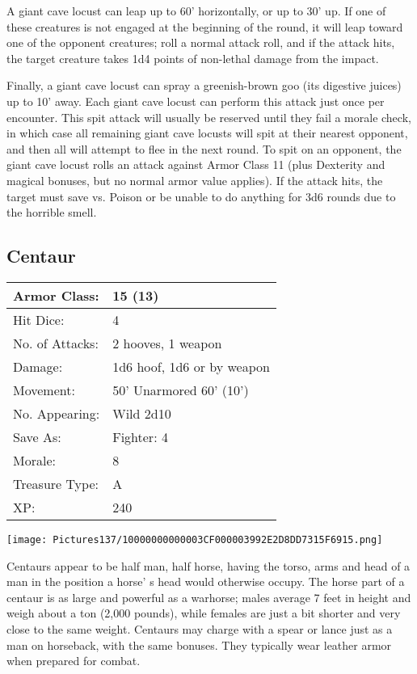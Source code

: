 \documentclass[a4paper,twoside,openany,10pt]{book}
\begin{document}
\begin{multicols}{2}
A giant cave locust can leap up to 60' horizontally, or up to 30' up. If one of these creatures is not engaged at the beginning of the round, it will leap toward one of the opponent creatures; roll a normal attack roll, and if the attack hits, the target creature takes 1d4 points of non-lethal damage from the impact.

Finally, a giant cave locust can spray a greenish-brown goo (its digestive juices) up to 10' away. Each giant cave locust can perform this attack just once per encounter. This spit attack will usually be reserved until they fail a morale check, in which case all remaining giant cave locusts will spit at their nearest opponent, and then all will attempt to flee in the next round. To spit on an opponent, the giant cave locust rolls an attack against Armor Class 11 (plus Dexterity and magical bonuses, but no normal armor value applies). If the attack hits, the target must save vs. Poison or be unable to do anything for 3d6 rounds due to the horrible smell.

\subsection*{Centaur}\label{centaur}

\begin{tabularx}{0.48\textwidth}{@{}lX@{}}
Armor Class: & 15 (13) \\\hline
Hit Dice: & 4 \\\hline
No. of Attacks: & 2 hooves, 1 weapon \\\hline
Damage: & 1d6 hoof, 1d6 or by weapon \\\hline
Movement: & 50' Unarmored 60'
(10') \\\hline
No. Appearing: & Wild 2d10 \\\hline
Save As: & Fighter: 4 \\\hline
Morale: & 8 \\\hline
Treasure Type: & A \\\hline
XP: & 240 \\\hline
\end{tabularx}\medskip


\begin{center}
	\texttt{[image: Pictures137/10000000000003CF000003992E2D8DD7315F6915.png]}
\end{center}\medskip

Centaurs appear to be half man, half horse, having the torso, arms and head of a man in the position a horse' s head would otherwise occupy. The horse part of a centaur is as large and powerful as a warhorse; males average 7 feet in height and weigh about a ton (2,000 pounds), while females are just a bit shorter and very close to the same weight. Centaurs may charge with a spear or lance just as a man on horseback, with the same bonuses. They typically wear leather armor when prepared for combat.


\end{multicols}
\end{document}
